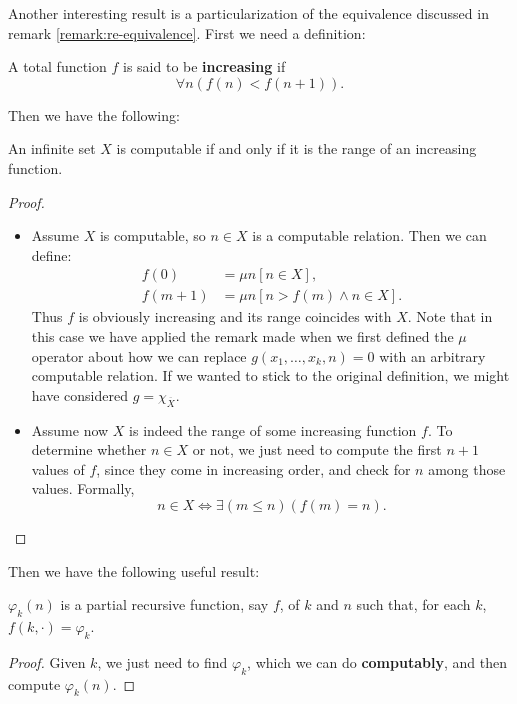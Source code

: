 \documentclass[../main.tex]{memoir}
\begin{document}
Another interesting result is a particularization of the equivalence discussed in remark \ref{remark:re-equivalence}. First we need a definition:

\begin{definition}
  A total function $f$ is said to be \textbf{increasing} if
  \[ \forall n (f(n) < f(n + 1)). \]
\end{definition}

Then we have the following:

\begin{lemma}
  An infinite set $X$ is computable if and only if it is the range of an increasing function.
\end{lemma}
\begin{proof}
  \begin{itemize}
  \item Assume $X$ is computable, so $n \in X$ is a computable relation. Then we can define:
    \begin{align*}
      f(0) & = \mu n [n \in X], \\
      f(m + 1) & = \mu n [n > f(m) \land n \in X].
    \end{align*}
    Thus $f$ is obviously increasing and its range coincides with $X$. Note that in this case we have applied the remark made when we first defined the $\mu$ operator about how we can replace $g(x_1, \ldots, x_k, n) = 0$ with an arbitrary computable relation. If we wanted to stick to the original definition, we might have considered $g = \chi_{\overline{X}}$.
  \item Assume now $X$ is indeed the range of some increasing function $f$. To determine whether $n \in X$ or not, we just need to compute the first $n + 1$ values of $f$, since they come in increasing order, and check for $n$ among those values. Formally,
    \[ n \in X \iff \exists (m \le n) (f(m) = n). \]
  \end{itemize}
\end{proof}


Then we have the following useful result:

\begin{theorem}
  $\varphi_k(n)$ is a partial recursive function, say $f$, of $k$ and $n$ such that, for each $k$, $f(k, \cdot) = \varphi_k$.
\end{theorem}
\begin{proof}
  Given $k$, we just need to find $\varphi_k$, which we can do \textbf{computably}, and then compute $\varphi_k(n)$.
\end{proof}
\end{document}
